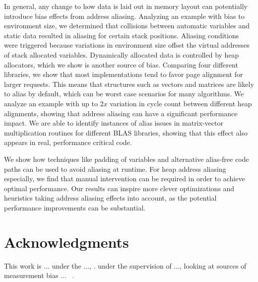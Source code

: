 \documentclass[10pt, conference, compsocconf]{IEEEtran}
\begin{document}
In general, any change to how data is laid out in memory layout can potentially introduce bias effects from address aliasing.
Analyzing an example with bias to environment size, we determined that collisions between automatic variables and static data resulted in aliasing for certain stack positions.
Aliasing conditions were triggered because variations in environment size offset the virtual addresses of stack allocated variables.
Dynamically allocated data is controlled by heap allocators, which we show is another source of bias.
Comparing four different libraries, we show that most implementations tend to favor page alignment for larger requests.
This means that structures such as vectors and matrices are likely to alias by default, which can be worst case scenarios for many algorithms.
We analyze an example with up to $2x$ variation in cycle count between different heap alignments, showing that address aliasing can have a significant performance impact.
We are able to identify instances of alias issues in matrix-vector multiplication routines for different BLAS libraries, showing that this effect also appears in real, performance critical code.

We show how techniques like padding of variables and alternative alias-free code paths can be used to avoid aliasing at runtime.
For heap address aliasing especially, we find that manual intervention can be required in order to achieve optimal performance.
Our results can inspire more clever optimizations and heuristics taking address aliasing effects into account, as the potential performance improvements can be substantial.

\section{Acknowledgments}
\iffalse
This work is forked from a Master's thesis project under the supervision of Anne Cathrine Elster and Rune Erlend Jensen, looking at sources of measurement bias on the Intel ``Ivy Bridge'' microarchitecture~\cite{MasterThesis}.
\fi
This work is ... under the ..., .
 under the supervision of ..., looking at sources of measurement bias ... ~\cite{MasterThesis}.





\end{document}
